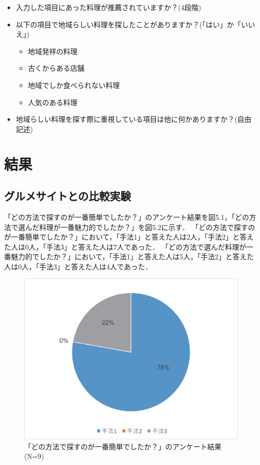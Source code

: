 \documentclass{funthesis}
\begin{document}
\begin{itemize}
 \item 入力した項目にあった料理が推薦されていますか？(4段階)
 \item 以下の項目で地域らしい料理を探したことがありますか？(「はい」か「いいえ」)
 \begin{itemize}
 \item 地域発祥の料理
  \item 古くからある店舗
   \item 地域でしか食べられない料理
    \item 人気のある料理
  \end{itemize}
 \item 地域らしい料理を探す際に重視している項目は他に何かありますか？(自由記述)
 \end{itemize}

\section{結果}
\subsection{グルメサイトとの比較実験}
「どの方法で探すのが一番簡単でしたか？」のアンケート結果を図5.1，「どの方法で選んだ料理が一番魅力的でしたか？」を図5.2に示す．
「どの方法で探すのが一番簡単でしたか？」において，「手法1」と答えた人は2人，「手法2」と答えた人は0人，「手法3」と答えた人は7人であった．
「どの方法で選んだ料理が一番魅力的でしたか？」において，「手法1」と答えた人は5人，「手法2」と答えた人は0人，「手法3」と答えた人は4人であった．

\begin{figure}[tbp]
  \begin{center}
    \includegraphics[clip,width=12cm]{5.1.eps}
    \caption[「どの方法で探すのが一番簡単でしたか？」のアンケート結果]{「どの方法で探すのが一番簡単でしたか？」のアンケート結果(N=9)}
  \end{center}
\end{figure}
\end{document}
